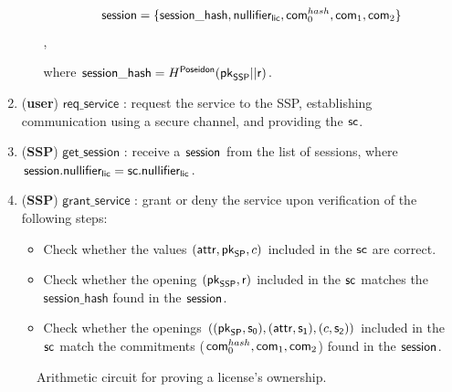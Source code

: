 \begin{enumerate}
\begin{itemize}
			$$\mathsf{session} = \{\mathsf{session\_hash}, \mathsf{nullifier_{lic}}, \mathsf{com}_0^{hash}, \mathsf{com}_1, \mathsf{com}_2\}$$,

		where $\mathsf{session\_hash} = H^\mathsf{Poseidon}(\mathsf{pk}_{\mathsf{SSP}} || \mathsf{r})$.


	\end{itemize}

	\item (\textbf{user}) $\mathsf{req\_service}$ : request the service to the SSP, establishing communication using a secure channel, and providing the $\mathsf{sc}$.

	\item (\textbf{SSP}) $\mathsf{get\_session}$ : receive a $\mathsf{session}$ from the list of sessions, where $\mathsf{session}.\mathsf{nullifier_{lic}} = \mathsf{sc}.\mathsf{nullifier_{lic}}$.

	\item (\textbf{SSP}) $\mathsf{grant\_service}$ : grant or deny the service upon verification of the following steps:

	\begin{itemize}
		\item Check whether the values $(\mathsf{attr}, \mathsf{pk}_{\mathsf{SP}}, c)$ included in the $\mathsf{sc}$ are correct.
		\item Check whether the opening $(\mathsf{pk}_{\mathsf{SSP}}, \mathsf{r})$ included in the $\mathsf{sc}$ matches the $\mathsf{session\_hash}$ found in the $\mathsf{session}$.
		\item Check whether the openings $((\mathsf{pk}_{\mathsf{SP}}, \mathsf{s_0}), (\mathsf{attr}, \mathsf{s_1}), (c, \mathsf{s_2}))$ included in the $\mathsf{sc}$ match the commitments ($\mathsf{com}_0^{hash}, \mathsf{com}_1, \mathsf{com}_2$) found in the $\mathsf{session}$.
	\end{itemize}

\end{enumerate}

\begin{figure}[h]
	\centering
	\setlength{\fboxsep}{5pt}%
	\setlength{\fboxrule}{0.3pt}%
	\caption{Arithmetic circuit for proving a license's ownership.}
	\label{fig:circuit_prove_nft}
\end{figure}

